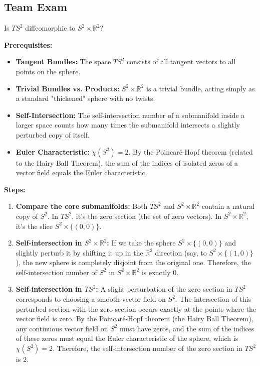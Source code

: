 \subsection{Team Exam}

\begin{exercise}
\label{geometry:2019:6}
Is $TS^{2}$ diffeomorphic to $S^{2} \times \mathbb{R}^{2}$?
\end{exercise}

\begin{solution}
\textbf{Prerequisites:}
\begin{itemize}
    \item \textbf{Tangent Bundles:} The space $TS^2$ consists of all tangent vectors to all points on the sphere.
    \item \textbf{Trivial Bundles vs. Products:} $S^2 \times \mathbb{R}^2$ is a trivial bundle, acting simply as a standard "thickened" sphere with no twists.
    \item \textbf{Self-Intersection:} The self-intersection number of a submanifold inside a larger space counts how many times the submanifold intersects a slightly perturbed copy of itself.
    \item \textbf{Euler Characteristic:} $\chi(S^2) = 2$. By the Poincaré-Hopf theorem (related to the Hairy Ball Theorem), the sum of the indices of isolated zeros of a vector field equals the Euler characteristic.
\end{itemize}

\medskip
\textbf{Steps:}
\begin{enumerate}
    \item \textbf{Compare the core submanifolds:} Both $TS^2$ and $S^2 \times \mathbb{R}^2$ contain a natural copy of $S^2$. In $TS^2$, it's the zero section (the set of zero vectors). In $S^2 \times \mathbb{R}^2$, it's the slice $S^2 \times \{(0,0)\}$.
    
    \item \textbf{Self-intersection in $S^2 \times \mathbb{R}^2$:} If we take the sphere $S^2 \times \{(0,0)\}$ and slightly perturb it by shifting it up in the $\mathbb{R}^2$ direction (say, to $S^2 \times \{(1,0)\}$), the new sphere is completely disjoint from the original one.
    Therefore, the self-intersection number of $S^2$ in $S^2 \times \mathbb{R}^2$ is exactly $0$.
    
    \item \textbf{Self-intersection in $TS^2$:} A slight perturbation of the zero section in $TS^2$ corresponds to choosing a smooth vector field on $S^2$.
    The intersection of this perturbed section with the zero section occurs exactly at the points where the vector field is zero.
    By the Poincaré-Hopf theorem (the Hairy Ball Theorem), any continuous vector field on $S^2$ must have zeros, and the sum of the indices of these zeros must equal the Euler characteristic of the sphere, which is $\chi(S^2) = 2$.
    Therefore, the self-intersection number of the zero section in $TS^2$ is $2$.
    

\end{enumerate}
\end{solution}
